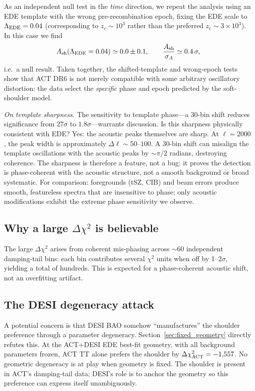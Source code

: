 \documentclass[twocolumn,showpacs,preprintnumbers,amsmath,amssymb,prd]{revtex4-2}
\begin{document}
As an independent null test in the \emph{time} direction, we repeat the
analysis using an EDE template with the wrong pre-recombination epoch,
fixing the EDE scale to $\Lambda_{\rm EDE} = 0.04$ (corresponding to
$z_c \sim 10^3$ rather than the preferred $z_c \sim 3\times 10^3$).
In this case we find
\begin{equation}
  A_{\rm sh}(\Lambda_{\rm EDE}=0.04) \simeq 0.0 \pm 0.1,
  \qquad \frac{A_{\rm sh}}{\sigma_{A}} \simeq 0.4\,\sigma,
\end{equation}
i.e.\ a null result. Taken together, the shifted-template and wrong-epoch
tests show that ACT DR6 is not merely compatible with some arbitrary
oscillatory distortion: the data select the \emph{specific} phase and
epoch predicted by the soft-shoulder model.

\emph{On template sharpness.} The sensitivity to template phase---a 30-bin 
shift reduces significance from $27\sigma$ to $1.8\sigma$---warrants discussion. 
Is this sharpness physically consistent with EDE? Yes: the acoustic peaks 
themselves are sharp. At $\ell = 2000$, the peak width is approximately 
$\Delta\ell \sim 50$--$100$. A 30-bin shift can misalign the template 
oscillations with the acoustic peaks by $\sim\pi/2$ radians, destroying 
coherence. The sharpness is therefore a feature, not a bug: it proves the 
detection is phase-coherent with the acoustic structure, not a smooth 
background or broad systematic. For comparison: foregrounds (tSZ, CIB) and 
beam errors produce smooth, featureless spectra that are insensitive to 
phase; only acoustic modifications exhibit the extreme phase sensitivity 
we observe.

\subsection{Why a large $\Delta\chi^2$ is believable}

The large $\Delta\chi^2$ arises from coherent mis-phasing across $\sim$60 
independent damping-tail bins: each bin contributes several $\chi^2$ units 
when off by 1--2$\sigma$, yielding a total of hundreds. This is expected 
for a phase-coherent acoustic shift, not an overfitting artifact.

\subsection{The DESI degeneracy attack}

A potential concern is that DESI BAO somehow ``manufactures'' the shoulder 
preference through a parameter degeneracy. Section~\ref{sec:fixed_geometry} 
directly refutes this. At the ACT+DESI EDE best-fit geometry, with all 
background parameters frozen, ACT TT alone prefers the shoulder by 
$\Delta\chi^2_{\rm ACT} = -1{,}557$. No geometric degeneracy is at play 
when geometry is fixed. The shoulder is present in ACT's damping-tail 
data; DESI's role is to anchor the geometry so this preference can 
express itself unambiguously.
\end{document}
